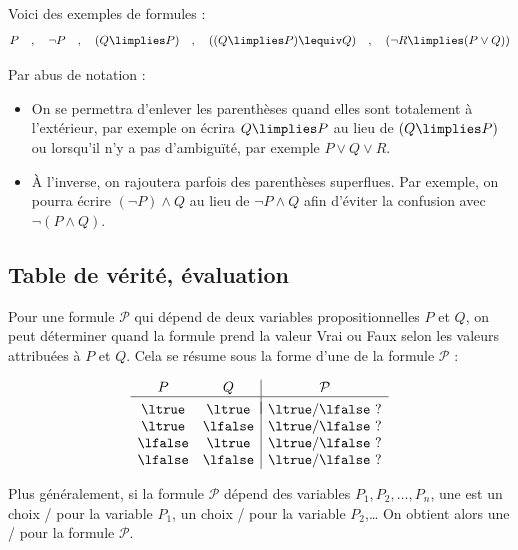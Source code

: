 \documentclass[11pt,class=report,crop=false]{standalone}
\begin{document}
Voici des exemples de formules :
\[
P \quad, \quad 
\lnot P \quad, \quad 
(Q \limplies P) \quad, \quad 
((Q \limplies P) \lequiv Q) \quad, \quad 
(\lnot R \limplies (P \lor Q))
\]

Par abus de notation :
\begin{itemize}
	\item On se permettra d'enlever les parenthèses quand elles sont totalement à l'extérieur, par exemple on écrira $Q \limplies P$  au lieu de $(Q \limplies P)$ ou lorsqu'il n'y a pas d'ambiguïté, par exemple $P \lor Q \lor R$.
	
	\item À l'inverse, on rajoutera parfois des parenthèses superflues. Par exemple, on pourra écrire $(\lnot P) \land Q$ au lieu de $\lnot P \land Q$ afin d'éviter la confusion avec $\lnot (P \land Q)$.
\end{itemize}

\subsection{Table de vérité, évaluation}

Pour une formule $\mathcal{P}$ qui dépend de deux variables propositionnelles $P$ et $Q$, on peut déterminer quand la formule prend la valeur Vrai ou Faux selon les valeurs attribuées à $P$ et $Q$. Cela se résume sous la forme d'une  de la formule $\mathcal{P}$ :

\[
\begin{array}{c c | c}
	P		& Q 		& \mathcal{P} \\
	\hline
	&&	\\[-2ex]
	\ltrue 	& \ltrue 	& \ltrue/\lfalse\ ? \\
	\ltrue 	& \lfalse 	& \ltrue/\lfalse\ ? \\
	\lfalse & \ltrue 	& \ltrue/\lfalse\ ? \\	
	\lfalse & \lfalse 	& \ltrue/\lfalse\ ? \\		
\end{array}
\]

Plus généralement, si la formule $\mathcal{P}$ dépend des variables $P_1, P_2,\ldots,P_n$,
une  est un choix \ltrue/\lfalse{} pour la variable $P_1$, un choix \ltrue/\lfalse{} pour la variable $P_2$,\ldots{}
On obtient alors une  \ltrue/\lfalse{} pour la formule $\mathcal{P}$.
\end{document}
